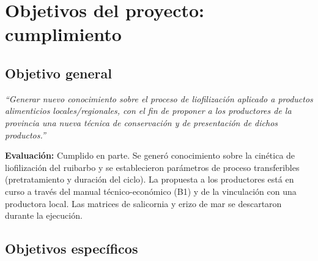 \documentclass[12pt, a4paper]{article}
\begin{document}
\section{Objetivos del proyecto: cumplimiento}

\subsection{Objetivo general}

\textit{``Generar nuevo conocimiento sobre el proceso de liofilización aplicado a productos alimenticios locales/regionales, con el fin de proponer a los productores de la provincia una nueva técnica de conservación y de presentación de dichos productos.''}

\textbf{Evaluación:} Cumplido en parte. Se generó conocimiento sobre la cinética de liofilización del ruibarbo y se establecieron parámetros de proceso transferibles (pretratamiento y duración del ciclo). La propuesta a los productores está en curso a través del manual técnico-económico (B1) y de la vinculación con una productora local. Las matrices de salicornia y erizo de mar se descartaron durante la ejecución.

\subsection{Objetivos específicos}
\end{document}
